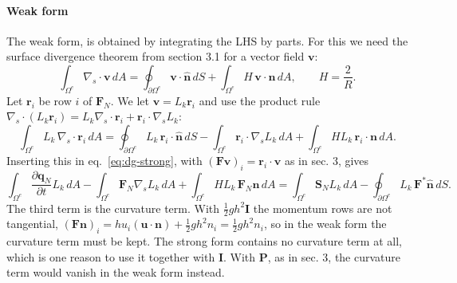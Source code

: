\paragraph{Weak form}
The weak form, is obtained by integrating the LHS by parts. For this we need the surface divergence theorem from section 3.1 for a vector field $\mathbf{v}$:
\begin{equation}\label{eq:dg-divthm}
    \int_{\Omega^e}\nabla_s\cdot\mathbf{v}\,dA = \oint_{\partial\Omega^e}\mathbf{v}\cdot\hat{\mathbf{n}}\,dS + \int_{\Omega^e}H\,\mathbf{v}\cdot\mathbf{n}\,dA, \qquad H = \frac{2}{R}.
\end{equation}
Let $\mathbf{r}_i$ be row $i$ of $\mathbf{F}_N$. We let $\mathbf{v} = L_k\mathbf{r}_i$ and use the product rule $\nabla_s\cdot(L_k\mathbf{r}_i) = L_k\nabla_s\cdot\mathbf{r}_i + \mathbf{r}_i\cdot\nabla_s L_k$:
\begin{equation}\label{eq:dg-ibp}
    \int_{\Omega^e}L_k\,\nabla_s\cdot\mathbf{r}_i\,dA = \oint_{\partial\Omega^e}L_k\,\mathbf{r}_i\cdot\hat{\mathbf{n}}\,dS - \int_{\Omega^e}\mathbf{r}_i\cdot\nabla_s L_k\,dA + \int_{\Omega^e}H L_k\,\mathbf{r}_i\cdot\mathbf{n}\,dA.
\end{equation}
Inserting this in eq.~\eqref{eq:dg-strong}, with $(\mathbf{F}\mathbf{v})_i = \mathbf{r}_i\cdot\mathbf{v}$ as in sec. 3, gives
\begin{equation}\label{eq:dg-weak}
    \int_{\Omega^e}\frac{\partial\mathbf{q}_N}{\partial t}L_k\,dA - \int_{\Omega^e}\mathbf{F}_N\nabla_s L_k\,dA + \int_{\Omega^e}H L_k\,\mathbf{F}_N\mathbf{n}\,dA = \int_{\Omega^e}\mathbf{S}_N L_k\,dA - \oint_{\partial\Omega^e}L_k\,\mathbf{F}^*\hat{\mathbf{n}}\,dS.
\end{equation}
The third term is the curvature term. With $\frac12gh^2\mathbf{I}$ the momentum rows are not tangential, $(\mathbf{F}\mathbf{n})_i = hu_i(\mathbf{u}\cdot\mathbf{n}) + \frac12gh^2n_i = \frac12gh^2n_i$, so in the weak form the curvature term must be kept. The strong form contains no curvature term at all, which is one reason to use it together with $\mathbf{I}$. With $\mathbf{P}$, as in sec. 3, the curvature term would vanish in the weak form instead.

